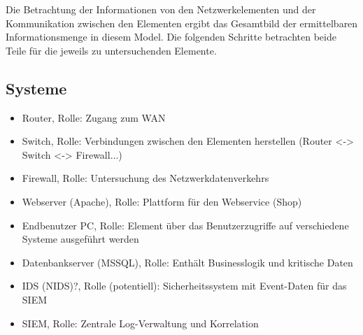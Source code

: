 Die Betrachtung der Informationen von den Netzwerkelementen und der Kommunikation zwischen den Elementen ergibt das Gesamtbild der ermittelbaren Informationsmenge in diesem Model. Die folgenden Schritte betrachten beide Teile für die jeweils zu untersuchenden Elemente.

\subsection{Systeme}




\begin{itemize}
\item Router, Rolle: Zugang zum WAN
\item Switch, Rolle: Verbindungen zwischen den Elementen herstellen (Router <-> Switch <-> Firewall...)
\item Firewall, Rolle: Untersuchung des Netzwerkdatenverkehrs 
\item Webserver (Apache), Rolle: Plattform für den Webservice (Shop)
\item Endbenutzer PC, Rolle: Element über das Benutzerzugriffe auf verschiedene Systeme ausgeführt werden
\item Datenbankserver (MSSQL), Rolle: Enthält Businesslogik und kritische Daten
\item IDS (NIDS)?, Rolle (potentiell): Sicherheitssystem mit Event-Daten für das SIEM
\item SIEM, Rolle: Zentrale Log-Verwaltung und Korrelation 
\end{itemize}
